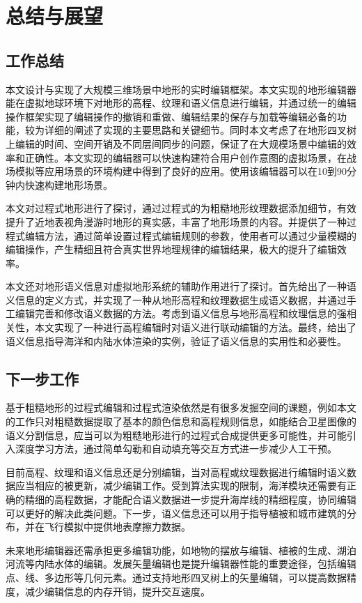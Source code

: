 
\chapter{总结与展望}
\section{工作总结}
本文设计与实现了大规模三维场景中地形的实时编辑框架。本文实现的地形编辑器能在虚拟地球环境下对地形的高程、纹理和语义信息进行编辑，并通过统一的编辑操作框架实现了编辑操作的撤销和重做、编辑结果的保存与加载等编辑必备的功能，较为详细的阐述了实现的主要思路和关键细节。同时本文考虑了在地形四叉树上编辑的时间、空间开销及不同层间同步的问题，保证了在大规模场景中编辑的效率和正确性。本文实现的编辑器可以快速构建符合用户创作意图的虚拟场景，在战场模拟等应用场景的环境构建中得到了良好的应用。使用该编辑器可以在10到90分钟内快速构建地形场景。\par
本文对过程式地形进行了探讨，通过过程式的为粗糙地形纹理数据添加细节，有效提升了近地表视角漫游时地形的真实感，丰富了地形场景的内容。并提供了一种过程式编辑方法，通过简单设置过程式编辑规则的参数，使用者可以通过少量模糊的编辑操作，产生精细且符合真实世界地理规律的编辑结果，极大的提升了编辑效率。\par
本文还对地形语义信息对虚拟地形系统的辅助作用进行了探讨。首先给出了一种语义信息的定义方式，并实现了一种从地形高程和纹理数据生成语义数据，并通过手工编辑完善和修改语义数据的方法。考虑到语义信息与地形高程和纹理信息的强相关性，本文实现了一种进行高程编辑时对语义进行联动编辑的方法。最终，给出了语义信息指导海洋和内陆水体渲染的实例，验证了语义信息的实用性和必要性。
\section{下一步工作}
基于粗糙地形的过程式编辑和过程式渲染依然是有很多发掘空间的课题，例如本文的工作只对粗糙数据提取了基本的颜色信息和高程规则信息，如能结合卫星图像的语义分割信息，应当可以为粗糙地形进行的过程式合成提供更多可能性，并可能引入深度学习方法，通过简单勾勒和自动填充等交互方式进一步减少人工干预。\par
目前高程、纹理和语义信息还是分别编辑，当对高程或纹理数据进行编辑时语义数据应当相应的被更新，减少编辑工作。受到算法实现的限制，海洋模块还需要有正确的精细的高程数据，才能配合语义数据进一步提升海岸线的精细程度，协同编辑可以更好的解决此类问题。下一步，语义信息还可以用于指导植被和城市建筑的分布，并在飞行模拟中提供地表摩擦力数据。\par
未来地形编辑器还需承担更多编辑功能，如地物的摆放与编辑、植被的生成、湖泊河流等内陆水体的编辑。发展矢量编辑也是提升编辑器性能的重要途径，包括编辑点、线、多边形等几何元素。通过支持地形四叉树上的矢量编辑，可以提高数据精度，减少编辑信息的内存开销，提升交互速度。

